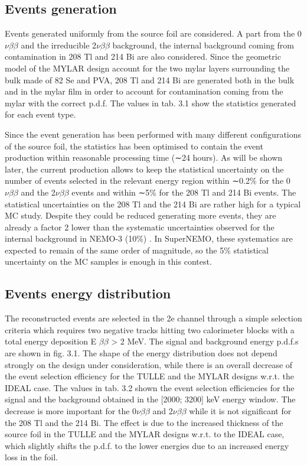 \documentclass[main.tex]{subfiles}
\begin{document}
\subsection{Events generation}


\NI Events generated uniformly from the source foil are considered. A part from
the 0$\nu\beta\beta$ and the irreducible 2$\nu\beta\beta$ background, the internal background coming from contamination in 208 Tl and 214 Bi are also considered. Since the geometric model of the MYLAR design account for the two mylar layers surrounding the bulk made of 82 Se and PVA, 208 Tl and 214 Bi are generated both in the bulk and in the mylar film in order to account for contamination coming from the mylar with the correct p.d.f. The values in tab. 3.1 show the statistics generated for each event type.


\bigskip


\NI Since the event generation has been performed with many different configurations of the source foil, the statistics has been optimised to contain the event production within reasonable processing time (∼24 hours). As will be shown later, the current production allows to keep the statistical uncertainty on the number of events selected in the relevant energy region within ∼0.2\% for the 0$\nu\beta\beta$ and the 2$\nu\beta\beta$ events and within ∼5\% for the 208 Tl and 214 Bi events. The statistical uncertainties on the 208 Tl and the 214 Bi are rather high for a typical MC study. Despite they could be reduced generating more events, they are already a factor 2 lower than the systematic uncertainties observed for the internal background in NEMO-3 (10\%) . In SuperNEMO, these systematics are expected to remain of the same order of magnitude, so the 5\% statistical uncertainty on the MC samples is enough in this contest.


\subsection{Events energy distribution}


\NI The reconstructed events are selected in the 2e channel through a simple selection criteria which requires two negative tracks hitting two calorimeter blocks with a total energy deposition E $\beta\beta$ > 2 MeV. The signal and background energy p.d.f.s are shown in fig. 3.1. The shape of the energy distribution does not depend strongly on the design under consideration, while there is an overall decrease of the event selection efficiency for the TULLE and the MYLAR designs w.r.t. the IDEAL case. The values in tab. 3.2 shown the event selection efficiencies for the signal and the background obtained in the [2000; 3200] keV energy window. The decrease is more important for the 0$\nu\beta\beta$ and 2$\nu\beta\beta$ while it is not significant for the 208 Tl and the 214 Bi. The effect is due to the increased thickness of the source foil in the TULLE and the MYLAR designs w.r.t. to the IDEAL case, which slightly shifts the p.d.f. to the lower energies due to an increased energy loss in the foil.
\end{document}
